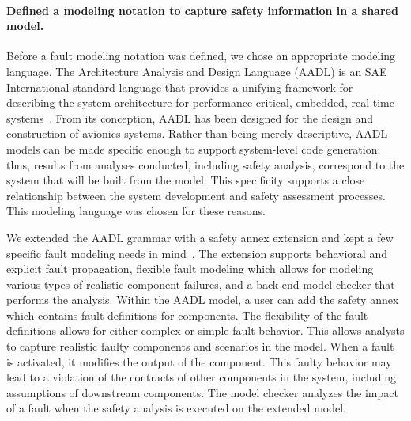 \paragraph{Defined a modeling notation to capture safety information in a shared model.}
Before a fault modeling notation was defined, we chose an appropriate modeling language. The Architecture Analysis and Design Language (AADL) is an SAE International standard language that provides a unifying framework for describing the system architecture for performance-critical, embedded, real-time systems~\cite{AADL_Standard,FeilerModelBasedEngineering2012}. From its conception, AADL has been designed for the design and construction of avionics systems.  Rather than being merely descriptive, AADL models can be made specific enough to support system-level code generation; thus, results from analyses conducted, including safety analysis, correspond to the system that will be built from the model.  This specificity supports a close relationship between the system development and safety assessment processes. This modeling language was chosen for these reasons. 

We extended the AADL grammar with a safety annex extension and kept a few specific fault modeling needs in mind~\cite{Stewart17:IMBSA, stewart2020safety}. The extension supports behavioral and explicit fault propagation, flexible fault modeling which allows for modeling various types of realistic component failures, and a back-end model checker that performs the analysis.  Within the AADL model, a user can add the safety annex which contains fault definitions for components. The flexibility of the fault definitions allows for either complex or simple fault behavior. This allows analysts to capture realistic faulty components and scenarios in the model. When a fault is activated, it modifies the output of the component. This faulty behavior may lead to a violation of the contracts of other components in the system, including assumptions of downstream components. The model checker analyzes the impact of a fault when the safety analysis is executed on the extended model.

